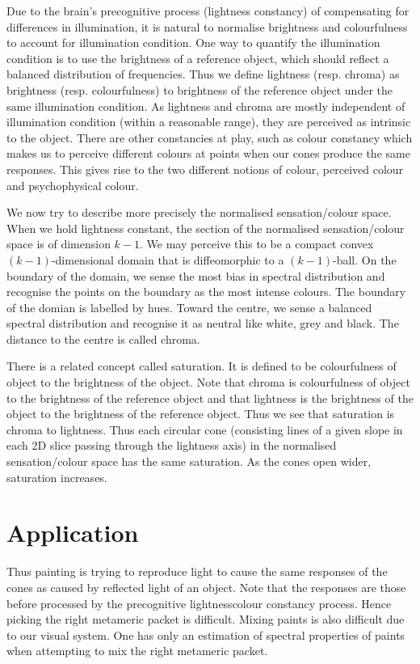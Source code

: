 \documentclass{amsart}
\begin{document}
Due to the brain's precognitive process (lightness constancy) of compensating for differences in illumination, it is natural to normalise brightness and colourfulness to account for illumination condition. One way to quantify the illumination condition is to use the brightness of a reference object, which should reflect a balanced distribution of frequencies. Thus we define lightness (resp. chroma) as brightness (resp. colourfulness) to brightness of the reference object under the same illumination condition. As lightness and chroma are mostly independent of illumination condition (within a reasonable range), they are perceived as intrinsic to the object. There are other constancies at play, such as colour constancy which makes us to perceive different colours at points  when  our cones produce the same responses. This gives rise to the two different notions of colour, perceived colour and psychophysical colour.

We now try to describe more precisely the normalised sensation/colour space. When we hold lightness constant, the section of the normalised sensation/colour space is of dimension $k-1$. We may perceive this to be a  compact convex $(k-1)$-dimensional domain   that is diffeomorphic to a $(k-1)$-ball. On the boundary of the domain, we sense the most bias in spectral distribution and recognise the points on the boundary as the most intense colours. The boundary of the domian is labelled by hues. Toward the centre, we sense a balanced spectral distribution  and recognise it as neutral like white, grey and black. The distance to the centre is called chroma.

There is a related concept called saturation. It is defined to be colourfulness of object to the brightness of the object. Note that chroma is colourfulness of object to the brightness of the reference object and that lightness is the brightness of the object to the brightness of the reference object. Thus we see that saturation is chroma to lightness. Thus each circular cone (consisting lines of a given slope in each 2D slice passing through the lightness axis) in the normalised sensation/colour space has the same saturation. As the cones  open wider,  saturation increases.

\section{Application}
\label{sec:application}

Thus painting is trying to reproduce light to cause the same responses of the cones as caused by reflected light of an object. Note that the responses are those before processed by the precognitive lightnesscolour constancy process. Hence picking the right metameric packet is difficult. Mixing paints is also difficult due to our visual system. One has only an estimation of spectral properties of paints when attempting to mix the right metameric packet.
\end{document}
